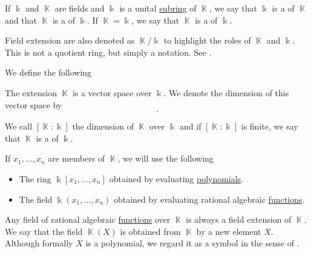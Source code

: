 \begin{definition}\label{def:field_extension}
  If \( \Bbbk \) and \( \BbbK \) are fields and \( \Bbbk \) is a unital \hyperref[def:first_order_substructure]{subring} of \( \BbbK \), we say that \( \Bbbk \) is a  of \( \BbbK \) and that \( \BbbK \) is a  of \( \Bbbk \). If \( \BbbK = \Bbbk \), we say that \( \BbbK \) is a  of \( \Bbbk \).

  Field extension are also denoted as \( \BbbK / \Bbbk \) to highlight the roles of \( \BbbK \) and \( \Bbbk \). This is not a quotient ring, but simply a notation. See .

  We define the following
  \begin{thmenum}
     The extension \( \BbbK \) is a vector space over \( \Bbbk \). We denote the dimension of this vector space by
    \begin{equation*}
      [\BbbK : \Bbbk].
    \end{equation*}

    We call \( [\BbbK : \Bbbk] \) the dimension of \( \BbbK \) over \( \Bbbk \) and if \( [\BbbK : \Bbbk] \) is finite, we say that \( \BbbK \) is a  of \( \Bbbk \).

     If \( x_1, \ldots, x_n \) are members of \( \BbbK \), we will use the following
    \begin{itemize}
      \item The ring \( \Bbbk[x_1, \ldots, x_n] \) obtained by evaluating \hyperref[thm:polynomial_ring_universal_property]{polynomials}.
      \item The field \( \Bbbk(x_1, \ldots, x_n) \) obtained by evaluating rational algebraic \hyperref[def:rational_algebraic_function]{functions}.
    \end{itemize}
  \end{thmenum}
\end{definition}

\begin{remark}\label{rem:adjoint_extension_field}
  Any field of rational algebraic \hyperref[def:rational_algebraic_function]{functions} over \( \BbbK \) is always a field extension of \( \BbbK \). We say that the field \( \BbbK(X) \) is obtained from \( \BbbK \) by  a new element \( X \). Although formally \( X \) is a polynomial, we regard it as a symbol in the sense of .
\end{remark}

